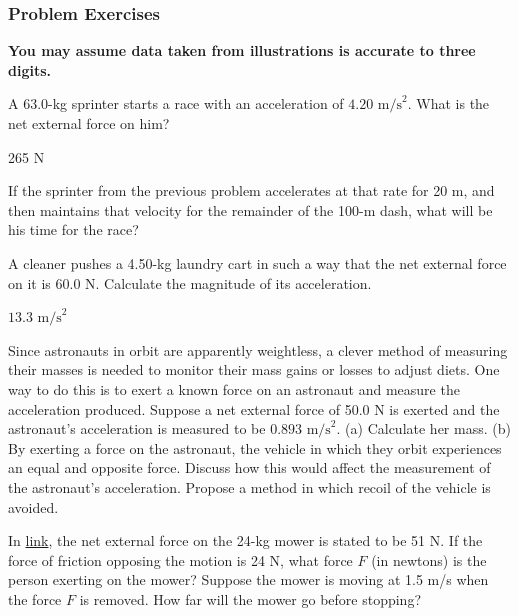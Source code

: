 \documentclass[
]{book}
\newenvironment{problems-exercises}{}{}
\begin{document}
\hypertarget{fs-id1910070}{}
\begin{problems-exercises}

\hypertarget{problem-exercises}{%
\subsubsection{Problem Exercises}\label{problem-exercises}}

\textbf{You may assume data taken from illustrations is accurate to three
digits.}

\hypertarget{fs-id2025052}{}
\leavevmode\hypertarget{fs-id2953075}{}%
A 63.0-kg sprinter starts a race with an acceleration of
\({4\text{.}\text{20\ m}\text{/s}^{2}}{}\). What is the net external force
on him?

\leavevmode\hypertarget{fs-id2000742}{}%
265 N

\hypertarget{fs-id3046116}{}
\leavevmode\hypertarget{fs-id1486491}{}%
If the sprinter from the previous problem accelerates at that rate for
20 m, and then maintains that velocity for the remainder of the 100-m
dash, what will be his time for the race?

\hypertarget{fs-id1947422}{}
\leavevmode\hypertarget{fs-id2383341}{}%
A cleaner pushes a 4.50-kg laundry cart in such a way that the net
external force on it is 60.0 N. Calculate the magnitude of its
acceleration.

\leavevmode\hypertarget{eip-id1377423}{}%
\(\text{13.3\ m/s}^{2}\)

\hypertarget{fs-id1829025}{}
\leavevmode\hypertarget{fs-id2930877}{}%
Since astronauts in orbit are apparently weightless, a clever method of
measuring their masses is needed to monitor their mass gains or losses
to adjust diets. One way to do this is to exert a known force on an
astronaut and measure the acceleration produced. Suppose a net external
force of 50.0 N is exerted and the astronaut's acceleration is measured
to be \({0\text{.}\text{893\ m/s}^{2}}{}\). (a) Calculate her mass. (b) By
exerting a force on the astronaut, the vehicle in which they orbit
experiences an equal and opposite force. Discuss how this would affect
the measurement of the astronaut's acceleration. Propose a method in
which recoil of the vehicle is avoided.

\hypertarget{fs-id2052918}{}
\leavevmode\hypertarget{fs-id3110260}{}%
In \protect\hyperlink{fs-id2602810}{link}, the net external force
on the 24-kg mower is stated to be 51 N. If the force of friction
opposing the motion is 24 N, what force \(F{}\) (in newtons) is the person
exerting on the mower? Suppose the mower is moving at 1.5 m/s when the
force \(F{}\) is removed. How far will the mower go before stopping?


\end{problems-exercises}
\end{document}
